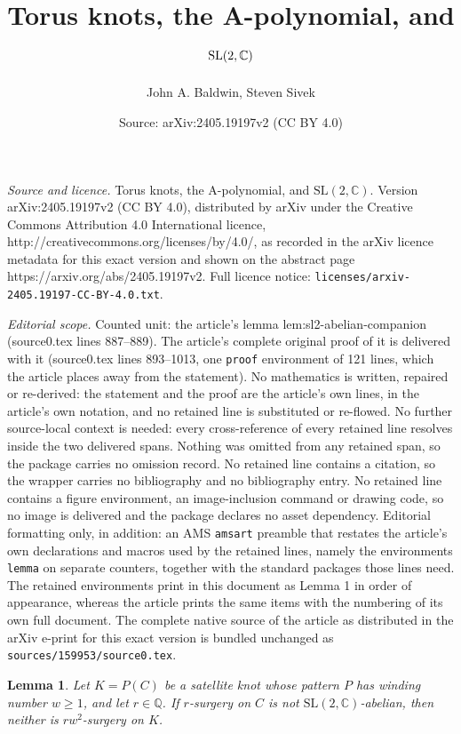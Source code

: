 \documentclass[10pt,a4paper]{amsart}
\title{Torus knots, the A-polynomial, and $\SL(2,\C)$}
\author{John A. Baldwin, Steven Sivek}
\date{Source: arXiv:2405.19197v2 (CC BY 4.0)}
\newtheorem{lemma}{Lemma}
\newcommand{\C}{\mathbb{C}}
\newcommand{\Q}{\mathbb{Q}}
\newcommand\SL{\mathrm{SL}}
\begin{document}
\maketitle

\noindent\emph{Source and licence.} Torus knots, the A-polynomial, and $\SL(2,\C)$. Version arXiv:2405.19197v2 (CC BY 4.0), distributed by arXiv under the Creative Commons Attribution 4.0 International licence, http://creativecommons.org/licenses/by/4.0/, as recorded in the arXiv licence metadata for this exact version and shown on the abstract page https://arxiv.org/abs/2405.19197v2. Full licence notice: \texttt{licenses/arxiv-2405.19197-CC-BY-4.0.txt}.\par\smallskip

\noindent\textit{Editorial scope.} Counted unit: the article's lemma lem:sl2-abelian-companion (source0.tex lines 887--889). The article's complete original proof of it is delivered with it (source0.tex lines 893--1013, one \texttt{proof} environment of 121 lines, which the article places away from the statement). No mathematics is written, repaired or re-derived: the statement and the proof are the article's own lines, in the article's own notation, and no retained line is substituted or re-flowed.  No further source-local context is needed: every cross-reference of every retained line resolves inside the two delivered spans.  Nothing was omitted from any retained span, so the package carries no omission record.  No retained line contains a citation, so the wrapper carries no bibliography and no bibliography entry.  No retained line contains a figure environment, an image-inclusion command or drawing code, so no image is delivered and the package declares no asset dependency.  Editorial formatting only, in addition: an AMS \texttt{amsart} preamble that restates the article's own declarations and macros used by the retained lines, namely the environments \texttt{lemma} on separate counters, together with the standard packages those lines need.  The retained environments print in this document as Lemma 1 in order of appearance, whereas the article prints the same items with the numbering of its own full document.  The complete native source of the article as distributed in the arXiv e-print for this exact version is bundled unchanged as \texttt{sources/159953/source0.tex}.
\begin{lemma} \label{lem:sl2-abelian-companion}
Let $K = P(C)$ be a satellite knot whose pattern $P$ has winding number $w \geq 1$, and let $r\in\Q$.  If $r$-surgery on $C$ is not $\SL(2,\C)$-abelian, then neither is $rw^2$-surgery on $K$.
\end{lemma}
\end{document}
